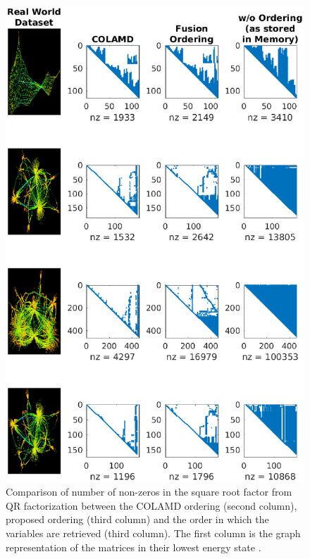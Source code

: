 \begin{figure}[!]
\includegraphics[width=\textwidth]{Chapters/figures3/ordering_comparison_1}
\caption{Comparison of number of non-zeros in the square root factor from QR factorization between the COLAMD ordering (second column), proposed ordering (third column) and the order in which the variables are retrieved (third column). The first column is the graph representation of the matrices in their lowest energy state \cite{suitesparse}.}
\label{fig:ordering_comparison_1}
\end{figure}
